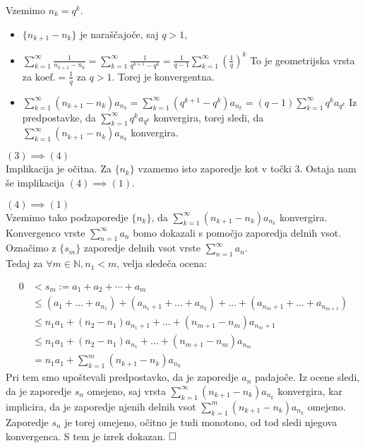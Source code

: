\documentclass[a4paper,12pt]{article}
\def\N{\mathbb{N}} %
\def\qed{$\hfill\Box$}   %
\begin{document}
Vzemimo ${n_k} = q^k$.
\begin{itemize}
    \item $\{n_{k+1} - n_k\}$ je naraščajoče, saj $ q > 1$,
    \item
    $\sum_{k = 1}^{\infty}{\frac{1}{n_{k+1} - n_k}} = 
    \sum_{k = 1}^{\infty}{\frac{1}{q^{k + 1} - q^k}} =
    \frac{1}{q - 1}\sum_{k = 1}^{\infty}{(\frac{1}{q})^k}$
    To je geometrijska vrsta za $\text{koef.} = \frac{1}{q}$ za $q > 1$. Torej je konvergentna.
    \item 
    $\sum_{k = 1}^{\infty}{(n_{k+1} - n_k)a_{n_k}} =
    \sum_{k = 1}^{\infty}{(q^{k + 1} - q^k)}a_{n_k} =
    (q - 1)\sum_{k = 1}^{\infty}{q^ka_{q^k}}$
    Iz predpostavke, da $\sum_{k = 1}^{\infty}{q^ka_{q^k}}$ konvergira, torej sledi,
    da $\sum_{k = 1}^{\infty}{(n_{k+1} - n_k)a_{n_k}}$ konvergira.
\end{itemize}

\noindent
$(3) \implies (4)$\\

Implikacija je očitna. Za $\{n_k\}$ vzamemo isto zaporedje kot v točki 3.
Ostaja nam še implikacija $(4) \implies (1)$.

\noindent
$(4) \implies (1)$\\
Vzemimo tako podzaporedje  $\{n_k\}$, da $\sum_{k = 1}^{\infty}{(n_{k+1} - n_k)a_{n_k}}$ konvergira.
Konvergenco vrste $\sum_{n = 1}^{\infty}{a_n}$ bomo dokazali s pomočjo zaporedja delnih vsot.
Označimo z $\{s_m\}$ zaporedje delnih vsot vrste $\sum_{n = 1}^{\infty}{a_n}$.\\
Tedaj za $\forall m \in \N, n_1 < m$, velja sledeča ocena:

\[
    \begin{split}
        0 & < s_m := a_1 + a_2 + \cdots + a_m \\
        & \leq (a_1 + \ldots + a_{n_1}) + (a_{n_{1} + 1} + \ldots + a_{n_{2}})
        + \ldots  + (a_{n_{m} + 1} + \ldots + a_{n_{m+1}})\\
        & \leq n_{1}a_{1} + (n_2 - n_1)a_{n_{1} + 1} + \ldots + (n_{m+1} - n_m)a_{n_{m}+1}\\
        & \leq n_{1}a_{1} + (n_2 - n_1)a_{n_1} + \ldots + (n_{m+1} - n_{m})a_{n_{m}}\\
        & = n_{1}a_{1} + \sum_{k = 1}^{m}{(n_{k+1} - n_k)a_{n_k}}
    \end{split}
\]
Pri tem smo upoštevali predpostavko, da je zaporedje $a_n$ padajoče.
Iz ocene sledi, da je zaporedje ${s_n}$ omejeno, saj vrsta $\sum_{k = 1}^{\infty}{(n_{k+1} - n_k)a_{n_k}}$ konvergira, 
kar implicira, da je zaporedje njenih delnih vsot $\sum_{k = 1}^{m}{(n_{k+1} - n_k)a_{n_k}}$ omejeno.
Zaporedje ${s_n}$ je torej omejeno, očitno je tudi monotono, od tod sledi njegova konvergenca.
S tem je izrek dokazan.
\qed
\end{document}
